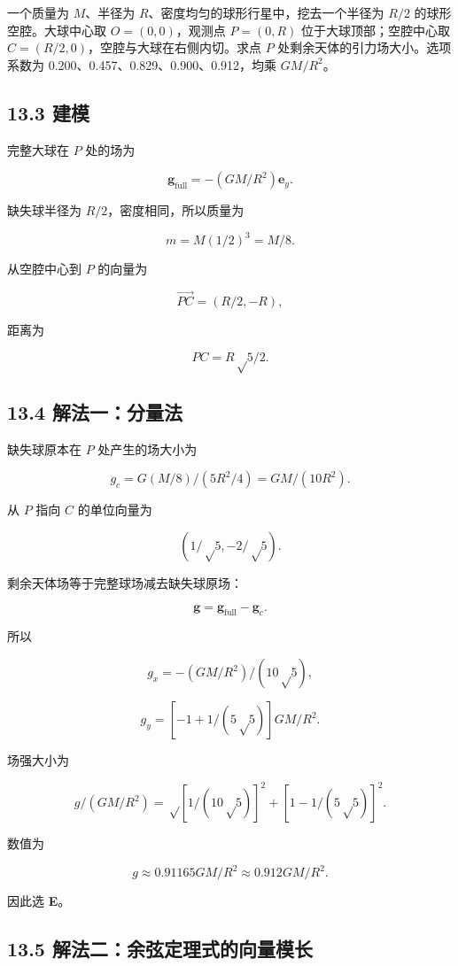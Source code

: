 \documentclass[
  11pt,
  UTF8]{ctexart}
\begin{document}
一个质量为 \(M\)、半径为 \(R\)、密度均匀的球形行星中，挖去一个半径为
\(R/2\) 的球形空腔。大球中心取 \(O=(0,0)\)，观测点 \(P=(0,R)\)
位于大球顶部；空腔中心取 \(C=(R/2,0)\)，空腔与大球在右侧内切。求点 \(P\)
处剩余天体的引力场大小。选项系数为
0.200、0.457、0.829、0.900、0.912，均乘 \(GM/R^2\)。

\hypertarget{ux5efaux6a21}{%
\subsection{13.3 建模}\label{ux5efaux6a21}}

完整大球在 \(P\) 处的场为

\[\boldsymbol g_{\text{full}}=-(GM/R^2)\boldsymbol e_y.\]

缺失球半径为 \(R/2\)，密度相同，所以质量为

\[m=M(1/2)^3=M/8.\]

从空腔中心到 \(P\) 的向量为

\[\overrightarrow{PC}=(R/2,-R),\]

距离为

\[PC=R√5/2.\]

\hypertarget{ux89e3ux6cd5ux4e00ux5206ux91cfux6cd5}{%
\subsection{13.4
解法一：分量法}\label{ux89e3ux6cd5ux4e00ux5206ux91cfux6cd5}}

缺失球原本在 \(P\) 处产生的场大小为

\[g_c=G(M/8)/(5R^2/4)=GM/(10R^2).\]

从 \(P\) 指向 \(C\) 的单位向量为

\[(1/√5,-2/√5).\]

剩余天体场等于完整球场减去缺失球原场：

\[\boldsymbol g=\boldsymbol g_{\text{full}}-\boldsymbol g_c.\]

所以

\[g_x=-(GM/R^2)/(10√5),\]

\[g_y=[-1+1/(5√5)]GM/R^2.\]

场强大小为

\[g/(GM/R^2)=√{[1/(10√5)]^2+[1-1/(5√5)]^2}.\]

数值为

\[g≈0.91165GM/R^2≈0.912GM/R^2.\]

因此选 \textbf{E}。

\hypertarget{ux89e3ux6cd5ux4e8cux4f59ux5f26ux5b9aux7406ux5f0fux7684ux5411ux91cfux6a21ux957f}{%
\subsection{13.5
解法二：余弦定理式的向量模长}\label{ux89e3ux6cd5ux4e8cux4f59ux5f26ux5b9aux7406ux5f0fux7684ux5411ux91cfux6a21ux957f}}
\end{document}
